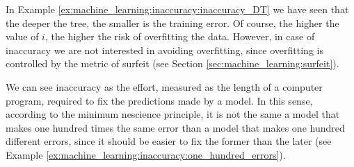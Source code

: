 In Example \ref{ex:machine_learning:inaccuracy:inaccuracy_DT} we have seen that the deeper the tree, the smaller is the training error. Of course, the higher the value of $i$, the higher the risk of overfitting the data. However, in case of inaccuracy we are not interested in avoiding overfitting, since overfitting is controlled by the metric of surfeit (see Section \ref{sec:machine_learning:surfeit}).

We can see inaccuracy as the effort, measured as the length of a computer program, required to fix the predictions made by a model. In this sense, according to the minimum nescience principle, it is not the same a model that makes one hundred times the same error than a model that makes one hundred different errors, since it should be easier to fix the former than the later (see Example \ref{ex:machine_learning:inaccuracy:one_hundred_errors}).

